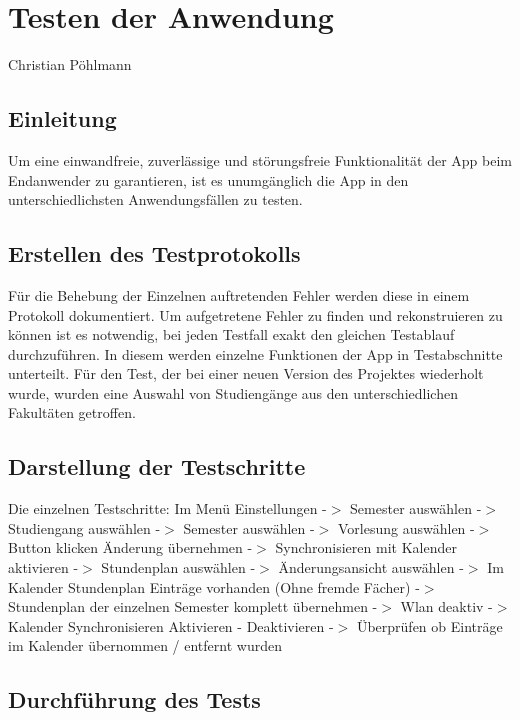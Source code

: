\chapter{Testen der Anwendung}
Christian Pöhlmann
\section{Einleitung}
Um eine einwandfreie, zuverlässige und störungsfreie Funktionalität der App beim Endanwender zu garantieren, ist es unumgänglich die App in den unterschiedlichsten Anwendungsfällen zu testen.
\section{Erstellen des Testprotokolls}
Für die Behebung der Einzelnen auftretenden Fehler werden diese in einem Protokoll dokumentiert. Um aufgetretene Fehler zu finden und rekonstruieren zu können ist es notwendig, bei jeden Testfall exakt den gleichen Testablauf durchzuführen. In diesem werden einzelne Funktionen der App in Testabschnitte unterteilt. Für den Test, der bei einer neuen Version des Projektes wiederholt wurde, wurden eine Auswahl von Studiengänge aus den unterschiedlichen Fakultäten getroffen.
\section{Darstellung der Testschritte}
Die einzelnen Testschritte: \newline 
{} Im Menü Einstellungen -$>$ Semester auswählen -$>$ Studiengang auswählen -$>$ Semester auswählen 
-$>$ Vorlesung auswählen -$>$ Button klicken Änderung übernehmen -$>$ Synchronisieren mit Kalender aktivieren  -$>$ Stundenplan auswählen  -$>$ Änderungsansicht auswählen  -$>$ Im Kalender Stundenplan Einträge vorhanden (Ohne fremde Fächer) -$>$ Stundenplan der einzelnen Semester komplett übernehmen -$>$ Wlan deaktiv -$>$ Kalender Synchronisieren Aktivieren - Deaktivieren  -$>$ Überprüfen ob Einträge im Kalender übernommen / entfernt wurden\newline
\newpage
\section{Durchführung des Tests}


